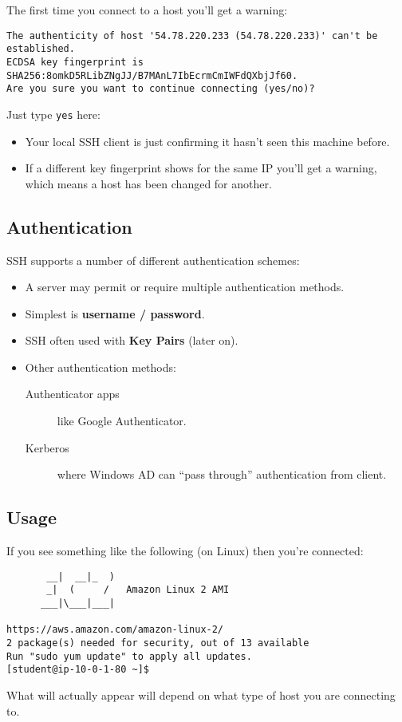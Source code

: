 \documentclass[slides]{pgnotes}
\begin{document}
The first time you connect to a host you'll get a warning:

\begin{verbatim}
The authenticity of host '54.78.220.233 (54.78.220.233)' can't be established.
ECDSA key fingerprint is SHA256:8omkD5RLibZNgJJ/B7MAnL7IbEcrmCmIWFdQXbjJf60.
Are you sure you want to continue connecting (yes/no)?
\end{verbatim}

Just type \texttt{yes} here:
\begin{itemize}
\item Your local SSH client is just confirming it hasn't seen this machine before.
\item If a different key fingerprint shows for the same IP you'll get a warning, which means a host has been changed for another.
\end{itemize}


\subsection{Authentication}

SSH supports a number of different authentication schemes:
\begin{itemize}
\item A server may permit or require multiple authentication methods.
\item Simplest is \textbf{username / password}.
\item SSH often used with \textbf{Key Pairs} (later on).
\item Other authentication methods:
  \begin{description}
  \item[Authenticator apps] like Google Authenticator.
  \item[Kerberos] where Windows AD can ``pass through'' authentication from client.
  \end{description}
\end{itemize}

\subsection{Usage}

If you see something like the following (on Linux) then you're connected:

\begin{verbatim}
       __|  __|_  )
       _|  (     /   Amazon Linux 2 AMI
      ___|\___|___|

https://aws.amazon.com/amazon-linux-2/
2 package(s) needed for security, out of 13 available
Run "sudo yum update" to apply all updates.
[student@ip-10-0-1-80 ~]$
\end{verbatim}

What will actually appear will depend on what type of host you are connecting to.
\end{document}

